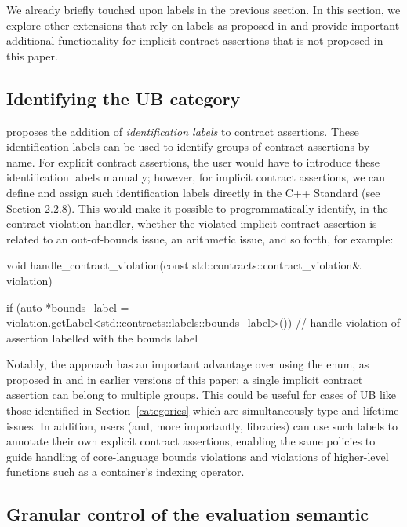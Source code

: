 We already briefly touched upon labels in the previous section. In this section, we explore other extensions that rely on labels as proposed in \cite{P3400R1} and provide important additional functionality for implicit contract assertions that is not proposed in this paper.

\subsection{Identifying the UB category}
\label{idlabels}

\cite{P3400R1} proposes the addition of \emph{identification labels} to contract assertions. These identification labels can be used to identify groups of contract assertions by name. For explicit contract assertions, the user would have to introduce these identification labels manually; however, for implicit contract assertions, we can define and assign such identification labels directly in the C++ Standard (see \cite{P3400R1} Section 2.2.8). This would make it possible to programmatically identify, in the contract-violation handler, whether the violated implicit contract assertion  is related to an out-of-bounds issue, an arithmetic issue, and so forth, for example:

\begin{codeblock}
void handle_contract_violation(const std::contracts::contract_violation& violation)
{
  if (auto *bounds_label =
      violation.getLabel<std::contracts::labels::bounds_label>()) {
      // handle violation of assertion labelled with the bounds label
  }
  
}
\end{codeblock}

Notably, the \cite{P3400R1} approach has an important advantage over using the  enum, as proposed in \cite{P3081R1} and in earlier versions of this paper: a single implicit contract assertion can belong to multiple groups. This could be useful for cases of UB like those identified in Section~\ref{categories} which are simultaneously type and lifetime issues.  In addition, users (and, more importantly, libraries) can use such labels to annotate their own explicit contract assertions, enabling the same policies to guide handling of core-language bounds violations and violations of higher-level functions such as a container's indexing operator.

\subsection{Granular control of the evaluation semantic}
\label{semantic}

